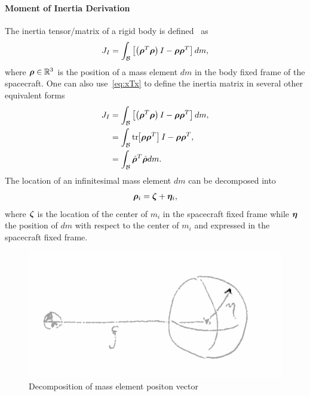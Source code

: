 \paragraph{Moment of Inertia Derivation}\label{sec:moment_of_inertia}
The inertia tensor/matrix of a rigid body is defined~\cite{greenwood1988} as
\begin{align}
    J_I = \int_{\mathcal{B}} \left[  \left( \bm{\rho}^T \bm{\rho}  \right)I - \bm{\rho}\bm{\rho}^T \right] dm, 
\end{align}
where \( \bm{\rho} \in \mathbb{R}^3 \) is the position of a mass element \( dm \) in the body fixed frame of the spacecraft.
One can also use~\cref{eq:xTx} to define the inertia matrix in several other equivalent forms
\begin{align*}
    J_I &= \int_{\mathcal{B}} \left[  \left( \bm{\rho}^T \bm{\rho}  \right)I - \bm{\rho}\bm{\rho}^T \right] dm, \\
        &= \int_{\mathcal{B}} \mathrm{tr}\negthickspace\left[ \bm{\rho}\bm{\rho}^T \right] I - \bm{\rho}\bm{\rho}^T, \\
        &= \int_{\mathcal{B}} \hat{\bm{\rho}}^T \hat{\bm{\rho}} dm.
\end{align*}
The location of an infinitesimal mass element \( dm \) can be decomposed into
\begin{align}\label{eq:mass_element_position}
    \bm{\rho}_i = \bm{\zeta} + \bm{\eta}_i, 
\end{align}
where \( \bm{\zeta} \) is the location of the center of \( m_i \) in the spacecraft fixed frame while \( \bm{\eta} \) the position of \( dm \) with respect to the center of \( m_i \) and expressed in the spacecraft fixed frame.
\begin{figure}[htbp]
    \centering
    \includegraphics[width=\textwidth]{figures/dumbbell_pos_vector.png}
    \caption{Decomposition of mass element positon vector}
    \label{fig:dumbbell_moi_mass_element_position}
\end{figure}
